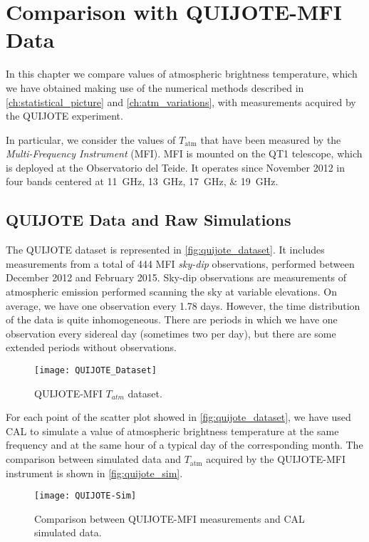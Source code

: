 \chapter{Comparison with QUIJOTE-MFI Data}\label{ch:comparison_quijote}

In this chapter we compare values of atmospheric brightness temperature,
which we have obtained making use of the numerical methods described in
\autoref{ch:statistical_picture} and \autoref{ch:atm_variations}, with
measurements acquired by the QUIJOTE experiment.

In particular, we consider the values of $T_\text{atm}$ that have been measured by the
\emph{Multi-Frequency Instrument} (MFI). MFI is mounted on
the QT1 telescope, which is deployed at the Observatorio del Teide. It
operates since November 2012 in four bands centered at
\SIlist{11;13;17;19}{\giga\hertz}.

\section{QUIJOTE Data and Raw Simulations}

The QUIJOTE dataset is represented in \autoref{fig:quijote_dataset}.  It
includes measurements from a total of \num{444} MFI \emph{sky-dip}
observations, performed between December 2012 and February 2015. Sky-dip
observations are measurements of atmospheric emission performed scanning
the sky at variable elevations. On average, we have one observation every
\num{1.78} days. However, the time distribution of the data is quite
inhomogeneous. There are periods in which we have one observation every
sidereal day (sometimes two per day), but there are some extended periods
without observations.

\begin{figure}
        \centering
        \texttt{[image: QUIJOTE\_Dataset]}
        \caption{QUIJOTE-MFI  $T_{atm}$ dataset.}
        \label{fig:quijote_dataset}
\end{figure}

For each point of the scatter plot showed in \autoref{fig:quijote_dataset},
we have used CAL to simulate a value of atmospheric brightness temperature
at the same frequency and at the same hour of a typical day of the
corresponding month. The comparison between simulated data and
$T_\text{atm}$ acquired by the QUIJOTE-MFI instrument is shown in
\autoref{fig:quijote_sim}.

\begin{figure}
        \centering
        \texttt{[image: QUIJOTE-Sim]}
        \caption{Comparison between QUIJOTE-MFI measurements and CAL
        simulated data.}
        \label{fig:quijote_sim}
\end{figure}

